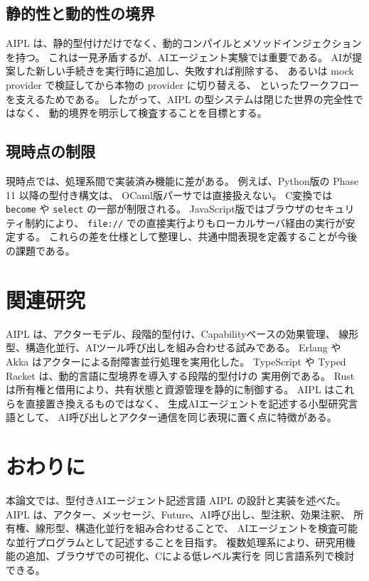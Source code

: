 \documentclass[11pt,a4paper,uplatex,dvipdfmx]{jsarticle}
\newcommand{\code}[1]{\texttt{#1}}
\begin{document}
\subsection{静的性と動的性の境界}

AIPL は、静的型付けだけでなく、動的コンパイルとメソッドインジェクションを持つ。
これは一見矛盾するが、AIエージェント実験では重要である。
AIが提案した新しい手続きを実行時に追加し、失敗すれば削除する、
あるいは mock provider で検証してから本物の provider に切り替える、
といったワークフローを支えるためである。
したがって、AIPL の型システムは閉じた世界の完全性ではなく、
動的境界を明示して検査することを目標とする。

\subsection{現時点の制限}

現時点では、処理系間で実装済み機能に差がある。
例えば、Python版の Phase 11 以降の型付き構文は、
OCaml版パーサでは直接扱えない。
C変換では \code{become} や \code{select} の一部が制限される。
JavaScript版ではブラウザのセキュリティ制約により、
\code{file://} での直接実行よりもローカルサーバ経由の実行が安定する。
これらの差を仕様として整理し、共通中間表現を定義することが今後の課題である。

\section{関連研究}

AIPL は、アクターモデル、段階的型付け、Capabilityベースの効果管理、
線形型、構造化並行、AIツール呼び出しを組み合わせる試みである。
Erlang や Akka はアクターによる耐障害並行処理を実用化した。
TypeScript や Typed Racket は、動的言語に型境界を導入する段階的型付けの
実用例である。
Rust は所有権と借用により、共有状態と資源管理を静的に制御する。
AIPL はこれらを直接置き換えるものではなく、
生成AIエージェントを記述する小型研究言語として、
AI呼び出しとアクター通信を同じ表現に置く点に特徴がある。

\section{おわりに}

本論文では、型付きAIエージェント記述言語 AIPL の設計と実装を述べた。
AIPL は、アクター、メッセージ、Future、AI呼び出し、型注釈、効果注釈、
所有権、線形型、構造化並行を組み合わせることで、
AIエージェントを検査可能な並行プログラムとして記述することを目指す。
複数処理系により、研究用機能の追加、ブラウザでの可視化、Cによる低レベル実行を
同じ言語系列で検討できる。
\end{document}

